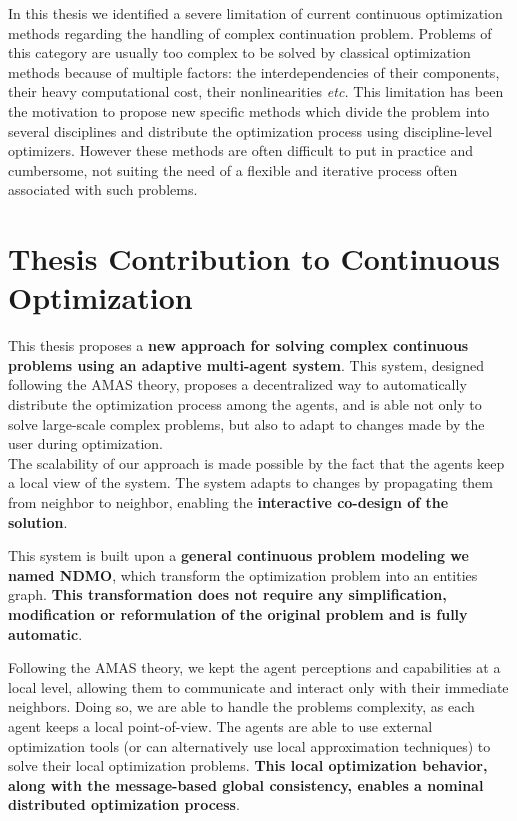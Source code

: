 
In this thesis we identified a severe limitation of current continuous optimization methods regarding the handling of complex continuation problem. Problems of this category are usually too complex to be solved by classical optimization methods because of multiple factors: the interdependencies of their components, their heavy computational cost, their nonlinearities \emph{etc.} This limitation has been the motivation to propose new specific methods which divide the problem into several disciplines and distribute the optimization process using discipline-level optimizers. However these methods are often difficult to put in practice and cumbersome, not suiting the need of a flexible and iterative process often associated with such problems.

\section*{Thesis Contribution to Continuous Optimization}

This thesis proposes a \textbf{new approach for solving complex continuous problems using an adaptive multi-agent system}. This system, designed following the AMAS theory, proposes a decentralized way to automatically distribute the optimization process among the agents, and is able not only to solve large-scale complex problems, but also to adapt to changes made by the user during optimization.\\
The scalability of our approach is made possible by the fact that the agents keep a local view of the system. The system adapts to changes by propagating them from neighbor to neighbor, enabling the \textbf{interactive co-design of the solution}.

This system is built upon a \textbf{general continuous problem modeling we named NDMO}, which transform the optimization problem into an entities graph. \textbf{This transformation does not require any simplification, modification or reformulation of the original problem and is fully automatic}.

Following the AMAS theory, we kept the agent perceptions and capabilities at a local level, allowing them to communicate and interact only with their immediate neighbors. Doing so, we are able to handle the problems complexity, as each agent keeps a local point-of-view. The agents are able to use external optimization tools (or can alternatively use local approximation techniques) to solve their local optimization problems. \textbf{This local optimization behavior, along with the message-based global consistency, enables a nominal distributed optimization process}.

